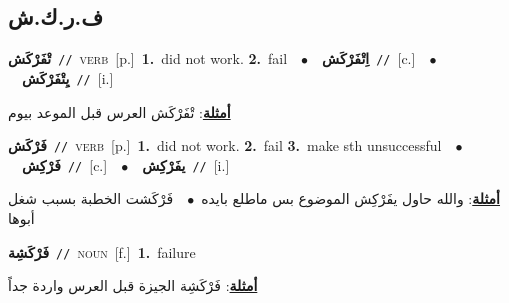 \documentclass[10pt,a4paper,twoside]{article} %
\begin{document}
\begin{multicols}{2}
\vspace{-3mm}
\subsection*{\color{blue}\foreignlanguage{arabic}{ف.ر.ك.ش}\color{blue}{}} 

{\setlength\topsep{0pt}\textbf{\foreignlanguage{arabic}{تْفَرْكَش}}\ {\color{gray}\texttt{//}\color{black}}\ \textsc{verb}\ [p.]\ \textbf{1.}~did not work.  \textbf{2.}~fail\ \ $\bullet$\ \ \setlength\topsep{0pt}\textbf{\foreignlanguage{arabic}{اِتْفَرْكَش}}\ {\color{gray}\texttt{//}\color{black}}\ [c.]\ \ $\bullet$\ \ \setlength\topsep{0pt}\textbf{\foreignlanguage{arabic}{يِتْفَرْكَش}}\ {\color{gray}\texttt{//}\color{black}}\ [i.]\  \begin{flushright}\color{gray}\foreignlanguage{arabic}{\textbf{\underline{\foreignlanguage{arabic}{أمثلة}}}: تْفَرْكَش العرس قبل الموعد بيوم}\end{flushright}\color{black}} \vspace{2mm}

{\setlength\topsep{0pt}\textbf{\foreignlanguage{arabic}{فَرْكَش}}\ {\color{gray}\texttt{//}\color{black}}\ \textsc{verb}\ [p.]\ \textbf{1.}~did not work.  \textbf{2.}~fail  \textbf{3.}~make sth unsuccessful\ \ $\bullet$\ \ \setlength\topsep{0pt}\textbf{\foreignlanguage{arabic}{فَرْكِش}}\ {\color{gray}\texttt{//}\color{black}}\ [c.]\ \ $\bullet$\ \ \setlength\topsep{0pt}\textbf{\foreignlanguage{arabic}{يفَرْكِش}}\ {\color{gray}\texttt{//}\color{black}}\ [i.]\  \begin{flushright}\color{gray}\foreignlanguage{arabic}{\textbf{\underline{\foreignlanguage{arabic}{أمثلة}}}: والله حاول يفَرْكِش الموضوع بس ماطلع بايده\ $\bullet$\ \  فَرْكَشت الخطبة بسبب شغل أبوها}\end{flushright}\color{black}} \vspace{2mm}

{\setlength\topsep{0pt}\textbf{\foreignlanguage{arabic}{فَرْكَشِة}}\ {\color{gray}\texttt{//}\color{black}}\ \textsc{noun}\ [f.]\ \textbf{1.}~failure\  \begin{flushright}\color{gray}\foreignlanguage{arabic}{\textbf{\underline{\foreignlanguage{arabic}{أمثلة}}}: فَرْكَشِة الجيزة قبل العرس واردة جداً}\end{flushright}\color{black}} \vspace{2mm}


\end{multicols}
\end{document}
